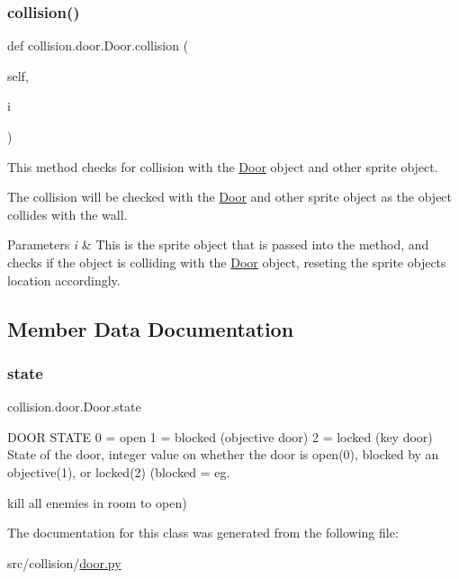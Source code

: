 \subsubsection{\texorpdfstring{collision()}{collision()}}
{\footnotesize\ttfamily def collision.\+door.\+Door.\+collision (\begin{DoxyParamCaption}\item[{}]{self,  }\item[{}]{i }\end{DoxyParamCaption})}



This method checks for collision with the \hyperlink{classcollision_1_1door_1_1_door}{Door} object and other sprite object. 

The collision will be checked with the \hyperlink{classcollision_1_1door_1_1_door}{Door} and other sprite object as the object collides with the wall. 
\begin{DoxyParams}{Parameters}
{\em i} & This is the sprite object that is passed into the method, and checks if the object is colliding with the \hyperlink{classcollision_1_1door_1_1_door}{Door} object, reseting the sprite objects location accordingly. \\
\hline
\end{DoxyParams}


\subsection{Member Data Documentation}
\mbox{\label{classcollision_1_1door_1_1_door_a22802ca389469576ecc1418e8c3e20b8}} 
\subsubsection{\texorpdfstring{state}{state}}
{\footnotesize\ttfamily collision.\+door.\+Door.\+state}



D\+O\+OR S\+T\+A\+TE 0 = open 1 = blocked (objective door) 2 = locked (key door) State of the door, integer value on whether the door is open(0), blocked by an objective(1), or locked(2) (blocked = eg. 

kill all enemies in room to open) 

The documentation for this class was generated from the following file\+:\begin{DoxyCompactItemize}
\item 
src/collision/\hyperlink{door_8py}{door.\+py}\end{DoxyCompactItemize}
